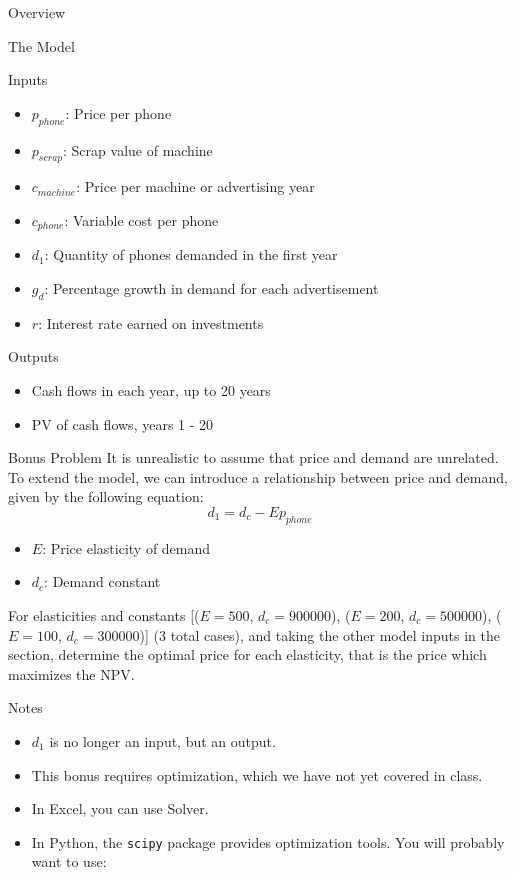 \documentclass[]{article}
\begin{document}
\begin{section}{Overview}
\begin{subsection}{The Model}
\begin{subsubsection}{Inputs}
\begin{itemize}
\item $p_{phone}$: Price per phone
\item $p_{scrap}$: Scrap value of machine
\item $c_{machine}$: Price per machine or advertising year
\item $c_{phone}$: Variable cost per phone
\item $d_1$: Quantity of phones demanded in the first year
\item $g_d$: Percentage growth in demand for each advertisement
\item $r$: Interest rate earned on investments
\end{itemize}
\end{subsubsection}
\begin{subsubsection}{Outputs}
\begin{itemize}
\item Cash flows in each year, up to 20 years
\item PV of cash flows, years 1 - 20
\end{itemize}
\end{subsubsection}
\end{subsection}
\begin{subsection}{Bonus Problem}
It is unrealistic to assume that price and demand are unrelated. To extend the model, we can introduce a relationship between price and demand, given by the following equation: 
\begin{equation}
	d_1 = d_c - Ep_{phone}
\end{equation}
\begin{itemize}
\item $E$: Price elasticity of demand
\item $d_c$: Demand constant
\end{itemize}
For elasticities and constants [($E = 500$, $d_c = 900000$), ($E = 200$, $d_c = 500000$), ($E = 100$, $d_c = 300000$)] (3 total cases), and taking the other model inputs in the 
 section, determine the optimal price for each elasticity, that is the price which maximizes the NPV.
\begin{subsubsection}{Notes}
\begin{itemize}
\item $d_1$ is no longer an input, but an output.
\item This bonus requires optimization, which we have not yet covered in class.
\item In Excel, you can use Solver.
\item In Python, the \texttt{scipy} package provides optimization tools. You will probably want to use:

\end{itemize}
\end{subsubsection}
\end{subsection}
\end{section}
\end{document}
